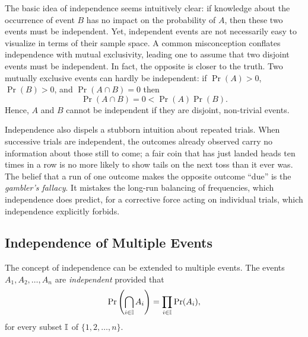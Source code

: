 The basic idea of independence seems intuitively clear: if knowledge about the occurrence of event $B$ has no impact on the probability of $A$, then these two events must be independent.
Yet, independent events are not necessarily easy to visualize in terms of their sample space.
A common misconception conflates independence with mutual exclusivity, leading one to assume that two disjoint events must be independent.
In fact, the opposite is closer to the truth.
Two mutually exclusive events can hardly be independent: if $\Pr (A) > 0$, $\Pr (B) > 0$, and $\Pr (A \cap B) = 0$ then
\begin{equation*}
\Pr (A \cap B) = 0 < \Pr (A) \Pr(B).
\end{equation*}
Hence, $A$ and $B$ cannot be independent if they are disjoint, non-trivial events.

Independence also dispels a stubborn intuition about repeated trials.
When successive trials are independent, the outcomes already observed carry no information about those still to come;
a fair coin that has just landed heads ten times in a row is no more likely to show tails on the next toss than it ever was.
The belief that a run of one outcome makes the opposite outcome ``due'' is the \emph{gambler's fallacy}.
It mistakes the long-run balancing of frequencies, which independence does predict, for a corrective force acting on individual trials, which independence explicitly forbids.


\subsection{Independence of Multiple Events}

The concept of independence can be extended to multiple events.
The events $A_1, A_2, \ldots, A_n$ are \emph{independent} provided that 
\begin{equation} \label{equation:IndependenceMultipleEvents}
\Pr \left( \bigcap_{i \in \mathbb{I}} A_i \right)
= \prod_{i \in \mathbb{I}} \Pr (A_i) ,
\end{equation}
for every subset $\mathbb{I}$ of $\{1, 2, \ldots, n\}$.

